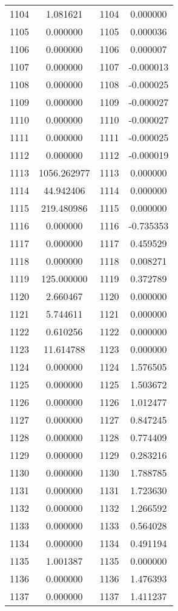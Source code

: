 \documentclass[12pt]{article}
\begin{document}
\begin{longtable}{@{}cccc@{}}
1104 & 1.081621 & 1104 & 0.000000 \\
1105 & 0.000000 & 1105 & 0.000036 \\
1106 & 0.000000 & 1106 & 0.000007 \\
1107 & 0.000000 & 1107 & -0.000013 \\
1108 & 0.000000 & 1108 & -0.000025 \\
1109 & 0.000000 & 1109 & -0.000027 \\
1110 & 0.000000 & 1110 & -0.000027 \\
1111 & 0.000000 & 1111 & -0.000025 \\
1112 & 0.000000 & 1112 & -0.000019 \\
1113 & 1056.262977 & 1113 & 0.000000 \\
1114 & 44.942406 & 1114 & 0.000000 \\
1115 & 219.480986 & 1115 & 0.000000 \\
1116 & 0.000000 & 1116 & -0.735353 \\
1117 & 0.000000 & 1117 & 0.459529 \\
1118 & 0.000000 & 1118 & 0.008271 \\
1119 & 125.000000 & 1119 & 0.372789 \\
1120 & 2.660467 & 1120 & 0.000000 \\
1121 & 5.744611 & 1121 & 0.000000 \\
1122 & 0.610256 & 1122 & 0.000000 \\
1123 & 11.614788 & 1123 & 0.000000 \\
1124 & 0.000000 & 1124 & 1.576505 \\
1125 & 0.000000 & 1125 & 1.503672 \\
1126 & 0.000000 & 1126 & 1.012477 \\
1127 & 0.000000 & 1127 & 0.847245 \\
1128 & 0.000000 & 1128 & 0.774409 \\
1129 & 0.000000 & 1129 & 0.283216 \\
1130 & 0.000000 & 1130 & 1.788785 \\
1131 & 0.000000 & 1131 & 1.723630 \\
1132 & 0.000000 & 1132 & 1.266592 \\
1133 & 0.000000 & 1133 & 0.564028 \\
1134 & 0.000000 & 1134 & 0.491194 \\
1135 & 1.001387 & 1135 & 0.000000 \\
1136 & 0.000000 & 1136 & 1.476393 \\
1137 & 0.000000 & 1137 & 1.411237 \\

\end{longtable}
\end{document}
